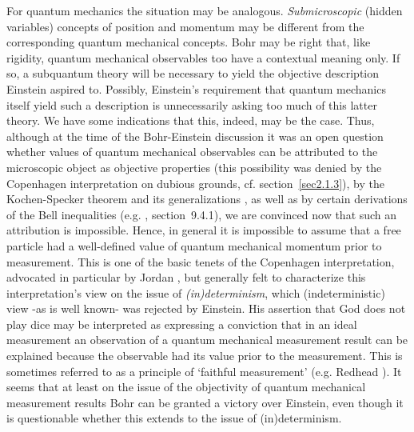 \documentclass[12pt]{article}
\begin{document}
For quantum mechanics the situation may be analogous. {\em
Submicroscopic} (hidden variables) concepts of position and
momentum may be different from the corresponding quantum
mechanical concepts. Bohr may be right that, like rigidity,
quantum mechanical observables too have a contextual meaning only.
If so, a subquantum theory will be necessary to yield the
objective description Einstein aspired to. Possibly, Einstein's
requirement that quantum mechanics itself yield such a description
is unnecessarily asking too much of this latter theory. We have
some indications that this, indeed, may be the case. Thus,
although at the time of the Bohr-Einstein discussion it was an
open question whether values of quantum mechanical observables can
be attributed to the microscopic object as objective properties
(this possibility was denied by the Copenhagen interpretation on
dubious grounds, cf. section~\ref{sec2.1.3}), by the
Kochen-Specker theorem and its generalizations
\cite{KS,Mermin90,Mermin90b,Peres91,Mermin93}, as well as by
certain derivations of the Bell inequalities (e.g. \cite{dM2002},
section~9.4.1), we are convinced now that such an attribution is
impossible. Hence, in general it is impossible to assume that a
free particle had a well-defined value of quantum mechanical
momentum prior to measurement. This is one of the basic tenets of
the Copenhagen interpretation, advocated in particular by Jordan
\cite{Jord34}, but generally felt to characterize this
interpretation's view on the issue of {\em (in)determinism}, which
(indeterministic) view -as is well known- was rejected by
Einstein. His assertion that God does not play dice may be
interpreted as expressing a conviction that in an ideal
measurement an observation of a quantum mechanical measurement
result can be explained because the observable had its value prior
to the measurement. This is sometimes referred to as a principle
of `faithful measurement' (e.g. Redhead \cite{Redhead}). It seems
that at least on the issue of the objectivity of quantum
mechanical measurement results Bohr can be granted a victory over
Einstein, even though it is questionable whether this extends to
the issue of (in)determinism.
\end{document}
